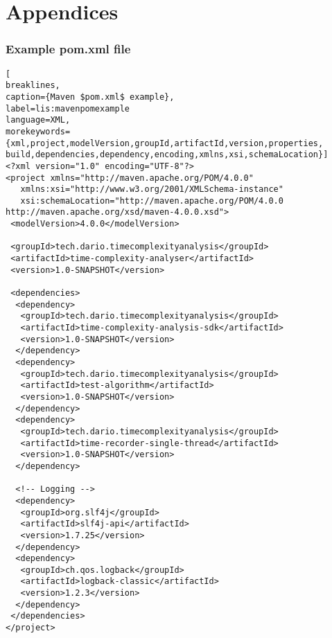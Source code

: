 \chapter{Appendices}

\subsection{Example pom.xml file}
\label{sec:appendices:examplepomfile}

\begin{lstlisting}[
breaklines,
caption={Maven $pom.xml$ example},
label=lis:mavenpomexample
language=XML,
morekeywords={xml,project,modelVersion,groupId,artifactId,version,properties,
build,dependencies,dependency,encoding,xmlns,xsi,schemaLocation}]
<?xml version="1.0" encoding="UTF-8"?>
<project xmlns="http://maven.apache.org/POM/4.0.0"
   xmlns:xsi="http://www.w3.org/2001/XMLSchema-instance"
   xsi:schemaLocation="http://maven.apache.org/POM/4.0.0 http://maven.apache.org/xsd/maven-4.0.0.xsd">
 <modelVersion>4.0.0</modelVersion>

 <groupId>tech.dario.timecomplexityanalysis</groupId>
 <artifactId>time-complexity-analyser</artifactId>
 <version>1.0-SNAPSHOT</version>

 <dependencies>
  <dependency>
   <groupId>tech.dario.timecomplexityanalysis</groupId>
   <artifactId>time-complexity-analysis-sdk</artifactId>
   <version>1.0-SNAPSHOT</version>
  </dependency>
  <dependency>
   <groupId>tech.dario.timecomplexityanalysis</groupId>
   <artifactId>test-algorithm</artifactId>
   <version>1.0-SNAPSHOT</version>
  </dependency>
  <dependency>
   <groupId>tech.dario.timecomplexityanalysis</groupId>
   <artifactId>time-recorder-single-thread</artifactId>
   <version>1.0-SNAPSHOT</version>
  </dependency>

  <!-- Logging -->
  <dependency>
   <groupId>org.slf4j</groupId>
   <artifactId>slf4j-api</artifactId>
   <version>1.7.25</version>
  </dependency>
  <dependency>
   <groupId>ch.qos.logback</groupId>
   <artifactId>logback-classic</artifactId>
   <version>1.2.3</version>
  </dependency>
 </dependencies>
</project>
\end{lstlisting}
